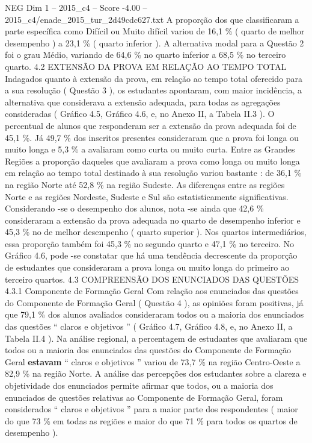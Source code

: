 \begin{textsample}{NEG Dim 1 – 2015\_c4 – Score -4.00 – 2015\_c4/enade\_2015\_tur\_2d49cdc627.txt}
A proporção dos que classificaram a parte específica como Difícil ou Muito difícil variou de 16,1 \% ( quarto de melhor desempenho ) a 23,1 \% ( quarto inferior ).
A alternativa modal para a Questão 2 foi o grau Médio, variando de 64,6 \% no quarto inferior a 68,5 \% no terceiro quarto. 4.2 EXTENSÃO DA PROVA EM RELAÇÃO AO TEMPO TOTAL Indagados quanto à extensão da prova, em relação ao tempo total oferecido para a sua resolução ( Questão 3 ), os estudantes apontaram, com maior incidência, a alternativa que considerava a extensão adequada, para todas as agregações consideradas ( Gráfico 4.5, Gráfico 4.6, e, no Anexo II, a Tabela II.3 ).
O percentual de alunos que responderam ser a extensão da prova adequada foi de 45,1 \%.
Já 49,7 \% dos inscritos presentes consideraram que a prova foi longa ou muito longa e 5,3 \% a avaliaram como curta ou muito curta.
Entre as Grandes Regiões a proporção daqueles que avaliaram a prova como longa ou muito longa em relação ao tempo total destinado à sua resolução variou bastante : de 36,1 \% na região Norte até 52,8 \% na região Sudeste.
As diferenças entre as regiões Norte e as regiões Nordeste, Sudeste e Sul são estatisticamente significativas.
Considerando -se o desempenho dos alunos, nota -se ainda que 42,6 \% consideraram a extensão da prova adequada no quarto de desempenho inferior e 45,3 \% no de melhor desempenho ( quarto superior ).
Nos quartos intermediários, essa proporção também foi 45,3 \% no segundo quarto e 47,1 \% no terceiro.
No Gráfico 4.6, pode -se constatar que há uma tendência decrescente da proporção de estudantes que consideraram a prova longa ou muito longa do primeiro ao terceiro quartos. 4.3 COMPREENSÃO DOS ENUNCIADOS DAS QUESTÕES 4.3.1 Componente de Formação Geral Com relação aos enunciados das questões do Componente de Formação Geral ( Questão 4 ), as opiniões foram positivas, já que 79,1 \% dos alunos avaliados consideraram todos ou a maioria dos enunciados das questões “ claros e objetivos ” ( Gráfico 4.7, Gráfico 4.8, e, no Anexo II, a Tabela II.4 ).
Na análise regional, a percentagem de estudantes que avaliaram que todos ou a maioria dos enunciados das questões do Componente de Formação Geral \textbf{estavam} “ claros e objetivos ” variou de 73,7 \% na região Centro-Oeste a 82,9 \% na região Norte.
A análise das percepções dos estudantes sobre a clareza e objetividade dos enunciados permite afirmar que todos, ou a maioria dos enunciados de questões relativas ao Componente de Formação Geral, foram considerados “ claros e objetivos ” para a maior parte dos respondentes ( maior do que 73 \% em todas as regiões e maior do que 71 \% para todos os quartos de desempenho ).

\end{textsample}
